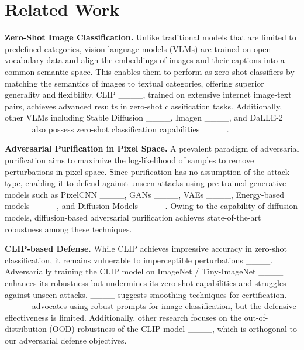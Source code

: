 \section{Related Work}
\textbf{Zero-Shot Image Classification.}
Unlike traditional models that are limited to predefined categories, vision-language models (VLMs) are trained on open-vocabulary data and align the embeddings of images and their captions into a common semantic space. This enables them to perform as zero-shot classifiers by matching the semantics of images to textual categories, offering superior generality and flexibility. CLIP ____, trained on extensive internet image-text pairs, achieves advanced results in zero-shot classification tasks. Additionally, other VLMs including Stable Diffusion ____, Imagen ____, and DaLLE-2 ____ also possess zero-shot classification capabilities ____.

\textbf{Adversarial Purification in Pixel Space.}
A prevalent paradigm of adversarial purification aims to maximize the log-likelihood of samples to remove perturbations in pixel space. Since purification has no assumption of the attack type, enabling it to defend against unseen attacks using pre-trained generative models such as PixelCNN ____, GANs ____, VAEs ____, Energy-based models ____, and Diffusion Models ____. Owing to the capability of diffusion models, diffusion-based adversarial purification achieves state-of-the-art robustness among these techniques.



\textbf{CLIP-based Defense.}
While CLIP achieves impressive accuracy in zero-shot classification, it remains vulnerable to imperceptible perturbations ____. Adversarially training the CLIP model on ImageNet / Tiny-ImageNet ____ enhances its robustness but undermines its zero-shot capabilities and struggles against unseen attacks. ____ suggests smoothing techniques for certification. ____ advocates using robust prompts for image classification, but the defensive effectiveness is limited. Additionally, other research focuses on the out-of-distribution (OOD) robustness of the CLIP model ____, which is orthogonal to our adversarial defense objectives.

%